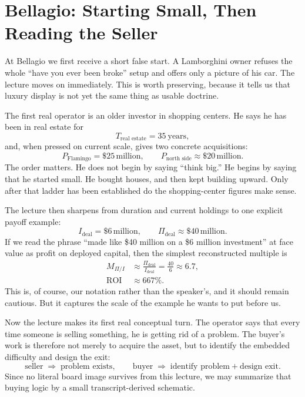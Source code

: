 \section{Bellagio: Starting Small, Then Reading the Seller}

At Bellagio we first receive a short false start. A Lamborghini owner refuses the whole ``have you ever been broke'' setup and offers only a picture of his car. The lecture moves on immediately. This is worth preserving, because it tells us that luxury display is not yet the same thing as usable doctrine.

The first real operator is an older investor in shopping centers. He says he has been in real estate for
\begin{equation}
T_{\text{real estate}} = 35\ \text{years},
\end{equation}
and, when pressed on current scale, gives two concrete acquisitions:
\begin{equation}
P_{\text{Flamingo}} = \$25\,\text{million},\qquad
P_{\text{north side}} \approx \$20\,\text{million}.
\end{equation}
The order matters. He does not begin by saying ``think big.'' He begins by saying that he started small. He bought houses, and then kept building upward. Only after that ladder has been established do the shopping-center figures make sense.

The lecture then sharpens from duration and current holdings to one explicit payoff example:
\begin{equation}
I_{\text{deal}} = \$6\,\text{million},\qquad
\Pi_{\text{deal}} \approx \$40\,\text{million}.
\end{equation}
If we read the phrase ``made like \$40 million on a \$6 million investment'' at face value as profit on deployed capital, then the simplest reconstructed multiple is
\begin{align}
M_{\Pi/I}
&\approx \frac{\Pi_{\text{deal}}}{I_{\text{deal}}}
= \frac{40}{6}
\approx 6.7,\\
\text{ROI}
&\approx 667\%.
\end{align}
This is, of course, our notation rather than the speaker's, and it should remain cautious. But it captures the scale of the example he wants to put before us.

Now the lecture makes its first real conceptual turn. The operator says that every time someone is selling something, he is getting rid of a problem. The buyer's work is therefore not merely to acquire the asset, but to identify the embedded difficulty and design the exit:
\begin{equation}
\text{seller} \;\Rightarrow\; \text{problem exists},\qquad
\text{buyer} \;\Rightarrow\; \text{identify problem} + \text{design exit}.
\end{equation}
Since no literal board image survives from this lecture, we may summarize that buying logic by a small transcript-derived schematic.

